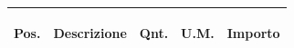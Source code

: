 \documentclass[a4paper]{article}
\begin{document}
                          \noindent\begin{tabular}{ | L{10mm} |  L{86mm} | L{12mm} | L{12mm} | L{16mm} | }
                          \hline
                          \vspace{2.5mm}
                          \begin{spacing}{0}
                            \textbf{Pos.}
                          \end{spacing} &
                          \vspace{2.5mm}
                          \begin{spacing}{0}
                            \textbf{Descrizione}
                          \end{spacing} &
                          \vspace{2.5mm}
                          \begin{spacing}{0}
                            \textbf{Qnt.}
                          \end{spacing} &
                          \vspace{2.5mm}
                          \begin{spacing}{0}
                            \textbf{U.M.}
                          \end{spacing} &
                          \vspace{2.5mm}
                          \begin{spacing}{0}
                            \textbf{Importo}
                          \end{spacing} \\
                          \hline
                       

\end{tabular}
\end{document}
